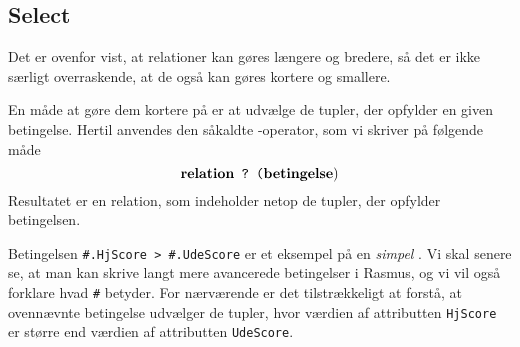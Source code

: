 \documentclass{article}
\newcounter{eks}
\begin{document}
\subsection{Select}
Det er ovenfor vist, at relationer kan g\o{}res l\ae{}ngere og bredere,
s\aa{} det er ikke s\ae{}rligt overraskende, at de ogs\aa{} kan g\o{}res
kortere og smallere.

En m\aa{}de at g\o{}re dem kortere p\aa{} er at udv\ae{}lge de tupler,
der opfylder en given betingelse. Hertil anvendes den s\aa{}kaldte
{\em {}}-operator, som vi skriver p\aa{} f\o{}lgende m\aa{}de
$$ \mbox{\bf relation} \mbox{\tt ~?~(} \mbox{\bf betingelse} ) $$
Resultatet er en relation, som indeholder netop de tupler, der opfylder
betingelsen.


Betingelsen \verb"#.HjScore > #.UdeScore" er et eksempel p\aa{} en
{\em simpel\/} . Vi skal senere se, at man kan skrive langt
mere avancerede be\-ting\-elser i {\sc Rasmus}, og vi vil ogs\aa{} forklare
hvad \verb"#" betyder. For n\ae{}r\-v\ae{}r\-en\-de er det tilstr\ae{}kkeligt
at forst\aa{}, at ovenn\ae{}vnte betingelse udv\ae{}lger de tup\-ler,
hvor v\ae{}rdien af attributten \verb"HjScore" er st\o{}rre end
v\ae{}rdien af attributten \verb"UdeScore".
\end{document}
